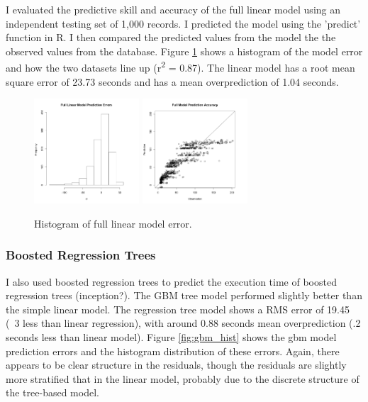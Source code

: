 \documentclass[a4paper]{article}
\begin{document}
I evaluated the predictive skill and accuracy of the full linear model using an independent testing set of 1,000 records.  I predicted the model using the 'predict' function in R.  I then compared the predicted values from the model the the observed values from the database. Figure  \ref{fig:full_hist} shows a histogram of the model error and how the two datasets line up (r\textsuperscript{2} = 0.87).  The linear model has a root mean square error of 23.73 seconds and has a mean overprediction of 1.04 seconds.  

\begin{figure}
\begin{centering}
\includegraphics[width=0.35\textwidth]{full_hist.png}
\includegraphics[width=0.35\textwidth]{full_model_accuracy.png}
\caption{\label{fig:full_hist}Histogram of full linear model error.}
\end{centering}
\end{figure}

\subsubsection{Boosted Regression Trees}
I also used boosted regression trees to predict the execution time of boosted regression trees (inception?).  The GBM tree model performed slightly better than the simple linear model.  The regression tree model shows a RMS error of 19.45 (~3 less than linear regression), with around 0.88 seconds mean overprediction (.2 seconds less than linear model).  Figure \ref{fig:gbm_hist} shows the gbm model prediction errors and the histogram distribution of these errors.  Again, there appears to be clear structure in the residuals, though the residuals are slightly more stratified that in the linear model, probably due to the discrete structure of the tree-based model.
\end{document}
